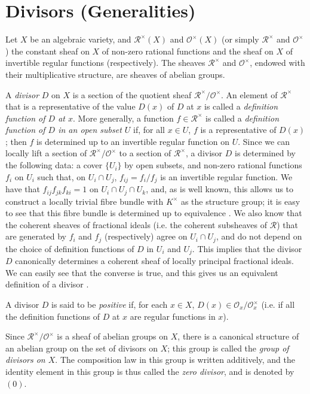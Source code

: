 \documentclass{article}
\newcommand{\scr}[1]{{\mathscr{#1}}}
\newcommand{\oldpage}[1]{\marginpar{\footnotesize$\Big\vert$ \textit{p.~#1}}}
\begin{document}
\section{Divisors (Generalities)}
\label{section3}

\oldpage{4-06}
Let $X$ be an algebraic variety, and $\scr{R}^\times(X)$ and $\scr{O}^\times(X)$ (or simply $\scr{R}^\times$ and $\scr{O}^\times$) the constant sheaf on $X$ of non-zero rational functions and the sheaf on $X$ of invertible regular functions (respectively).
The sheaves $\scr{R}^\times$ and $\scr{O}^\times$, endowed with their multiplicative structure, are sheaves of abelian groups.

A \emph{divisor} $D$ on $X$ is a section of the quotient sheaf $\scr{R}^\times/\scr{O}^\times$.
An element of $\scr{R}^\times$ that is a representative of the value $D(x)$ of $D$ at $x$ is called a \emph{definition function of $D$ at $x$}.
More generally, a function $f\in\scr{R}^\times$ is called a \emph{definition function of $D$ in an open subset $U$} if, for all $x\in U$, $f$ is a representative of $D(x)$; then $f$ is determined up to an invertible regular function on $U$.
Since we can locally lift a section of $\scr{R}^\times/\scr{O}^\times$ to a section of $\scr{R}^\times$, a divisor $D$ is determined by the following data: a cover $\{U_i\}$ by open subsets, and non-zero rational functions $f_i$ on $U_i$ such that, on $U_i\cap U_j$, $f_{ij}=f_i/f_j$ is an invertible regular function.
We have that $f_{ij}f_{jk}f_{ki}=1$ on $U_i\cap U_j\cap U_k$, and, as is well known, this allows us to construct a locally trivial fibre bundle with $K^\times$ as the structure group;
it is easy to see that this fibre bundle is determined up to equivalence \cite{7}.
We also know that the coherent sheaves of fractional ideals (i.e. the coherent subsheaves of $\scr{R}$) that are generated by $f_i$ and $f_j$ (respectively) agree on $U_i\cap U_j$, and do not depend on the choice of definition functions of $D$ in $U_i$ and $U_j$.
This implies that the divisor $D$ canonically determines a coherent sheaf of locally principal fractional ideals.
We can easily see that the converse is true, and this gives us an equivalent definition of a divisor \cite{1}.

A divisor $D$ is said to be \emph{positive} if, for each $x\in X$, $D(x)\in\scr{O}_x/\scr{O}_x^\times$ (i.e. if all the definition functions of $D$ at $x$ are regular functions in $x$).

Since $\scr{R}^\times/\scr{O}^\times$ is a sheaf of abelian groups on $X$, there is a canonical structure of an abelian group on the set of divisors on $X$;
this group is called the \emph{group of divisors on $X$}.
The composition law in this group is written additively, and the identity element in this group is thus called the \emph{zero divisor}, and is denoted by $(0)$.
\end{document}
